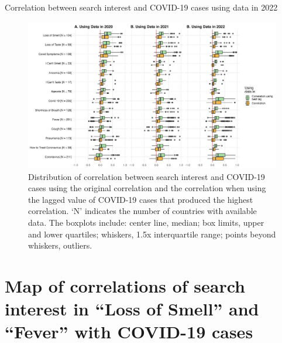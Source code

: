 \documentclass{article}
\begin{document}
\begin{table}[H]
\caption{Correlation between search interest and COVID-19 cases using data in 2022}
\label{tab:cor_table_2022}
\centering
\begin{adjustbox}{width=0.8\textwidth}

\end{adjustbox}
\end{table}

\begin{figure}[H]
    \includegraphics[width=1\textwidth]{figures/cor_corbest_fig.png}
    \caption{Distribution of correlation between search interest and COVID-19 cases using the original correlation and the correlation when using the lagged value of COVID-19 cases that produced the highest correlation. `N' indicates the number of countries with available data. The boxplots include: center line, median; box limits, upper and lower quartiles; whiskers, 1.5x interquartile range; points beyond whiskers, outliers.}
    \label{fig:cor_best}
\end{figure}

\newpage
\section{Map of correlations of search interest in ``Loss of Smell'' and ``Fever'' with COVID-19 cases}
\label{si:cor_map}
\end{document}
